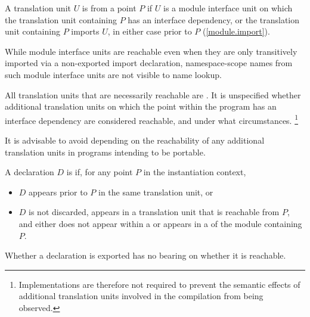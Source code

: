 \pnum
A translation unit $U$ is
from a point $P$ if
$U$ is a module interface unit on which the translation unit containing $P$
has an interface dependency, or
the translation unit containing $P$ imports $U$,
in either case prior to $P$ (\ref{module.import}).
\begin{note}
While module interface units are reachable even when they are only
transitively imported via a non-exported import declaration,
namespace-scope names from such module interface units are not visible
to name lookup.
\end{note}

\pnum
All translation units that are necessarily reachable are
.
It is unspecified whether additional translation units on which the
point within the program has an interface dependency are considered reachable,
and under what circumstances.%
\footnote{Implementations are therefore not required to prevent the semantic
effects of additional translation units involved in the compilation from being
observed.}
\begin{note}
It is advisable to avoid
depending on the reachability of any additional translation units
in programs intending to be portable.
\end{note}

\pnum
A declaration $D$ is
 if,
for any point $P$ in the
instantiation context,
\begin{itemize}
\item $D$ appears prior to $P$ in the same translation unit, or
\item $D$ is not discarded,
appears in a translation unit that is
reachable from $P$,
and
either does not appear within a 
or appears in a 
of the module containing $P$.
\end{itemize}
\begin{note}
Whether a declaration is exported has no bearing on whether it is reachable.
\end{note}

